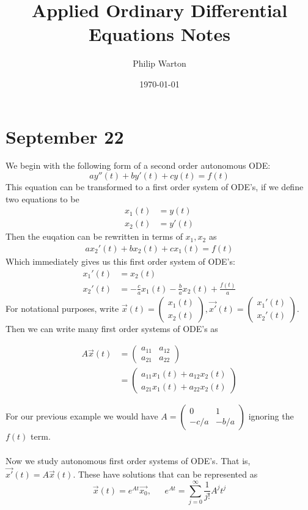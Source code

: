 \documentclass{article}
\theoremstyle{definition}
\begin{document}
\title{Applied Ordinary Differential Equations Notes}
\author{Philip Warton}
\date{\today}
\maketitle
\section{September 22}
We begin with the following form of a second order autonomous ODE:
\[
    ay''(t) + by'(t) + cy(t) = f(t)
\]
This equation can be transformed to a first order system of ODE's, if we define two equations to be 
\begin{align*}
    x_1(t) &= y(t) \\
    x_2(t) &= y'(t)
\end{align*}
Then the euqation can be rewritten in terms of $x_1, x_2$ as
\begin{align*}
    ax_2'(t) + bx_2(t) + cx_1(t) = f(t)
\end{align*}
Which immediately gives us this first order system of ODE's:
\begin{align*}
    x_1'(t) &= x_2(t) \\
    x_2'(t) &= -\frac{c}{a} x_1(t) - \frac{b}{a}x_2(t) + \frac{f(t)}{a}
\end{align*}
For notational purposes, write $\vec x (t) = \begin{pmatrix}
    x_1(t)\\x_2(t)
\end{pmatrix}, \vec{x'}(t) = \begin{pmatrix}
    x_1'(t)\\x_2'(t)
\end{pmatrix}$. Then we can write many first order systems of ODE's as 
\begin{mdframed}[]
    \begin{align*}
        A\vec x (t) &= \begin{pmatrix}
            a_{1 1} & a_{1 2} \\ a_{2 1} & a_{2 2}
        \end{pmatrix} \\
        &= \begin{pmatrix}
            a_{1 1}x_1(t) + a_{1 2}x_2(t) \\
            a_{2 1}x_1(t) + a_{2 2}x_2(t)
        \end{pmatrix}
    \end{align*}
\end{mdframed}
For our previous example we would have $A = \begin{pmatrix}
    0 & 1 \\ -c/a & -b/a
\end{pmatrix}$ ignoring the $f(t)$ term.\\\\
Now we study autonomous first order systems of ODE's. That is,$
    \vec{x'}(t) = A\vec x (t)$. These have solutions that can be represented as
\[
    \vec{x}(t) = e^{At} \vec{x_0}, \ \ \ \ \ \ \ e^{At} = \sum_{j=0}^{\infty} \frac{1}{j!} A^j t^j
\]
\end{document}
